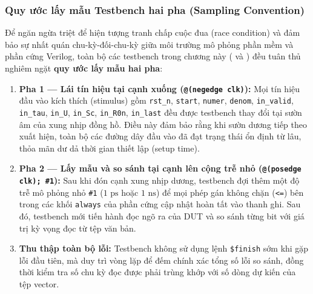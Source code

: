 \subsubsection*{Quy ước lấy mẫu Testbench hai pha (Sampling Convention)}
Để ngăn ngừa triệt để hiện tượng tranh chấp cuộc đua (race condition) và đảm bảo sự nhất quán chu-kỳ-đối-chu-kỳ giữa môi trường mô phỏng phần mềm và phần cứng Verilog, toàn bộ các testbench trong chương này ( và ) đều tuân thủ nghiêm ngặt \textbf{quy ước lấy mẫu hai pha}:
\begin{enumerate}[leftmargin=1.5em, itemsep=2pt]
    \item \textbf{Pha 1 --- Lái tín hiệu tại cạnh xuống (\texttt{@(negedge clk)}):} Mọi tín hiệu đầu vào kích thích (stimulus) gồm \texttt{rst\_n}, \texttt{start}, \texttt{numer}, \texttt{denom}, \texttt{in\_valid}, \texttt{in\_tau}, \texttt{in\_U}, \texttt{in\_Sc}, \texttt{in\_R0n}, \texttt{in\_last} đều được testbench thay đổi tại sườn âm của xung nhịp đồng hồ. Điều này đảm bảo rằng khi sườn dương tiếp theo xuất hiện, toàn bộ các đường dây đầu vào đã đạt trạng thái ổn định từ lâu, thỏa mãn dư dả thời gian thiết lập (setup time).
    \item \textbf{Pha 2 --- Lấy mẫu và so sánh tại cạnh lên cộng trễ nhỏ (\texttt{@(posedge clk); \#1}):} Sau khi đón cạnh xung nhịp dương, testbench đợi thêm một độ trễ mô phỏng nhỏ \texttt{\#1} ($1\text{ ps}$ hoặc $1\text{ ns}$) để mọi phép gán không chặn (\texttt{<=}) bên trong các khối \texttt{always} của phần cứng cập nhật hoàn tất vào thanh ghi. Sau đó, testbench mới tiến hành đọc ngõ ra của DUT và so sánh từng bit với giá trị kỳ vọng đọc từ tệp văn bản.
    \item \textbf{Thu thập toàn bộ lỗi:} Testbench không sử dụng lệnh \texttt{\$finish} sớm khi gặp lỗi đầu tiên, mà duy trì vòng lặp để đếm chính xác tổng số lỗi so sánh, đồng thời kiểm tra số chu kỳ đọc được phải trùng khớp với số dòng dự kiến của tệp vector.
\end{enumerate}

